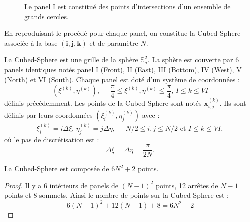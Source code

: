 \begin{figure}[htbp]
\begin{center}
\end{center}
\caption{Le panel I est constitué des points d'intersections d'un ensemble de grands cercles.}
\label{fig: panel I}
\end{figure}  

En reproduisant le procédé pour chaque panel, on constitue la Cubed-Sphere associée à la base $(\mathbf{i},\mathbf{j},\mathbf{k})$ et de paramètre $N$.

\begin{definition}
La Cubed-Sphere est une grille de la sphère $\mathbb{S}_a^2$. La sphère est couverte par 6 panels identiques notés panel I (Front), II (East), III (Bottom), IV (West), V (North) et VI (South). Chaque panel est doté d'un système de coordonnées :
\begin{equation}
\left( \xi^{(k)}, \eta^{(k)} \right) \text{, } -\dfrac{\pi}{4} \leq \xi^{(k)}, \eta^{(k)} \leq \dfrac{\pi}{4} \text{, } I \leq k \leq VI
\end{equation}
définis précédemment. Les points de la Cubed-Sphere sont notés $\mathbf{x}_{i,j}^{(k)}$. Ils sont définis par leurs coordonnées $\left( \xi_i^{(k)}, \eta_j^{(k)}  \right)$ avec :
\begin{equation}
\xi_i^{(k)} = i \Delta \xi \text{, } \eta_j^{(k)} = j \Delta \eta \text{, } -N/2 \leq i, j \leq N/2 \text{ et } I \leq k \leq VI,
\end{equation}
où le pas de discrétisation est :
\begin{equation}
\Delta \xi = \Delta \eta = \dfrac{\pi}{2 N}.
\end{equation}
\end{definition}

\begin{proposition}
La Cubed-Sphere est composée de $6N^2 +2$ points.
\end{proposition}

\begin{proof}
Il y a 6 intérieurs de panels de $(N-1)^2$ points, 12 arrêtes de $N-1$ points et 8 sommets. Ainsi le nombre de points sur la Cubed-Sphere est :
$$
6 (N-1)^2 + 12 (N-1)+8=6N^2+2
$$
\end{proof}

